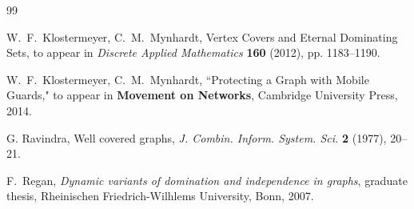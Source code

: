 \documentclass[12pt]{article}%
\begin{document}
\begin{thebibliography}{99}


W.~F.~Klostermeyer, C.~M.~Mynhardt, Vertex Covers and Eternal
Dominating Sets, to appear in \emph{Discrete Applied Mathematics} \textbf{160}
(2012), pp. 1183--1190.

W.~F.~Klostermeyer, C.~M.~Mynhardt, ``Protecting a Graph
with Mobile Guards," to appear in \textbf{{Movement on Networks}}, Cambridge
University Press, 2014.

G. Ravindra, Well covered graphs, \textit{J. Combin. Inform.
System. Sci.} \textbf{2} (1977), 20--21.

F.~Regan, \emph{Dynamic variants of domination and
independence in graphs}, graduate thesis, Rheinischen Friedrich-Wilhlems
University, Bonn, 2007.
\end{thebibliography}
\end{document}

